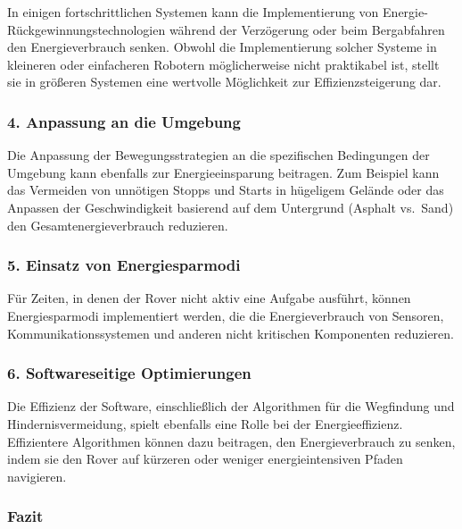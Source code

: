 \documentclass{vorlage-design-main}
\begin{document}
In einigen fortschrittlichen Systemen kann die Implementierung von
Energie-Rückgewinnungstechnologien während der Verzögerung oder beim
Bergabfahren den Energieverbrauch senken. Obwohl die Implementierung
solcher Systeme in kleineren oder einfacheren Robotern möglicherweise
nicht praktikabel ist, stellt sie in größeren Systemen eine wertvolle
Möglichkeit zur Effizienzsteigerung dar.

\hypertarget{anpassung-an-die-umgebung}{%
\subsubsection{\texorpdfstring{4. \textbf{Anpassung an die
Umgebung}}{4. Anpassung an die Umgebung}}\label{anpassung-an-die-umgebung}}

Die Anpassung der Bewegungsstrategien an die spezifischen Bedingungen
der Umgebung kann ebenfalls zur Energieeinsparung beitragen. Zum
Beispiel kann das Vermeiden von unnötigen Stopps und Starts in hügeligem
Gelände oder das Anpassen der Geschwindigkeit basierend auf dem
Untergrund (Asphalt vs.~Sand) den Gesamtenergieverbrauch reduzieren.

\hypertarget{einsatz-von-energiesparmodi}{%
\subsubsection{\texorpdfstring{5. \textbf{Einsatz von
Energiesparmodi}}{5. Einsatz von Energiesparmodi}}\label{einsatz-von-energiesparmodi}}

Für Zeiten, in denen der Rover nicht aktiv eine Aufgabe ausführt, können
Energiesparmodi implementiert werden, die die Energieverbrauch von
Sensoren, Kommunikationssystemen und anderen nicht kritischen
Komponenten reduzieren.

\hypertarget{softwareseitige-optimierungen}{%
\subsubsection{\texorpdfstring{6. \textbf{Softwareseitige
Optimierungen}}{6. Softwareseitige Optimierungen}}\label{softwareseitige-optimierungen}}

Die Effizienz der Software, einschließlich der Algorithmen für die
Wegfindung und Hindernisvermeidung, spielt ebenfalls eine Rolle bei der
Energieeffizienz. Effizientere Algorithmen können dazu beitragen, den
Energieverbrauch zu senken, indem sie den Rover auf kürzeren oder
weniger energieintensiven Pfaden navigieren.

\hypertarget{fazit}{%
\subsubsection{Fazit}\label{fazit}}
\end{document}

